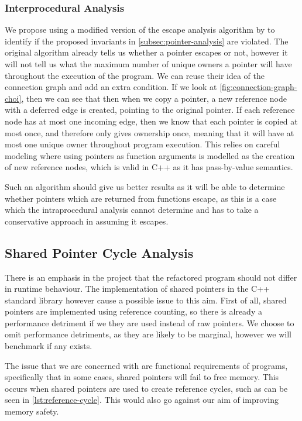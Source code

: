 \documentclass{proposal}
\begin{document}
    \subsubsection{Interprocedural Analysis}\label{subsubsec:interprocedural-analysis}

    We propose using a modified version of the escape analysis algorithm by \citet{Choi1999} to identify if the proposed invariants in \autoref{subsec:pointer-analysis} are violated.
    The original algorithm already tells us whether a pointer escapes or not, however it will not tell us what the maximum number of unique owners a pointer will have throughout the execution of the program.
    We can reuse their idea of the connection graph and add an extra condition.
    If we look at \autoref{fig:connection-graph-choi}, then we can see that then when we copy a pointer, a new reference node with a deferred edge is created, pointing to the original pointer.
    If each reference node has at most one incoming edge, then we know that each pointer is copied at most once, and therefore only gives ownership once, meaning that it will have at most one unique owner throughout program execution.
    This relies on careful modeling where using pointers as function arguments is modelled as the creation of new reference nodes, which is valid in C++ as it has pass-by-value semantics.

    Such an algorithm should give us better results as it will be able to determine whether pointers which are returned from functions escape, as this is a case which the intraprocedural analysis cannot determine and has to take a conservative approach in assuming it escapes.

    \subsection{Shared Pointer Cycle Analysis}\label{subsec:shared-pointer-cycle-analysis}

    There is an emphasis in the project that the refactored program should not differ in runtime behaviour.
    The implementation of shared pointers in the C++ standard library however cause a possible issue to this aim.
    First of all, shared pointers are implemented using reference counting, so there is already a performance detriment if we they are used instead of raw pointers.
    We choose to omit performance detriments, as they are likely to be marginal, however we will benchmark if any exists.

    The issue that we are concerned with are functional requirements of programs, specifically that in some cases, shared pointers will fail to free memory.
    This occurs when shared pointers are used to create reference cycles, such as can be seen in \autoref{lst:reference-cycle}.
    This would also go against our aim of improving memory safety.
\end{document}
